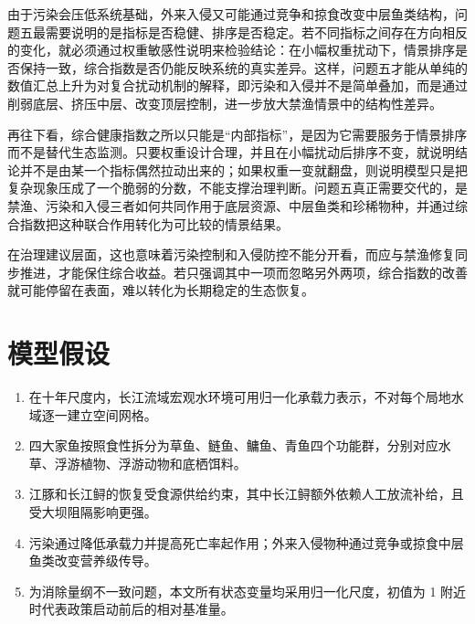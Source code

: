 \documentclass{MMCStyle}
\begin{document}
由于污染会压低系统基础，外来入侵又可能通过竞争和掠食改变中层鱼类结构，问题五最需要说明的是指标是否稳健、排序是否稳定。若不同指标之间存在方向相反的变化，就必须通过权重敏感性说明来检验结论：在小幅权重扰动下，情景排序是否保持一致，综合指数是否仍能反映系统的真实差异。这样，问题五才能从单纯的数值汇总上升为对复合扰动机制的解释，即污染和入侵并不是简单叠加，而是通过削弱底层、挤压中层、改变顶层控制，进一步放大禁渔情景中的结构性差异。

再往下看，综合健康指数之所以只能是“内部指标”，是因为它需要服务于情景排序而不是替代生态监测。只要权重设计合理，并且在小幅扰动后排序不变，就说明结论并不是由某一个指标偶然拉动出来的；如果权重一变就翻盘，则说明模型只是把复杂现象压成了一个脆弱的分数，不能支撑治理判断。问题五真正需要交代的，是禁渔、污染和入侵三者如何共同作用于底层资源、中层鱼类和珍稀物种，并通过综合指数把这种联合作用转化为可比较的情景结果。

在治理建议层面，这也意味着污染控制和入侵防控不能分开看，而应与禁渔修复同步推进，才能保住综合收益。若只强调其中一项而忽略另外两项，综合指数的改善就可能停留在表面，难以转化为长期稳定的生态恢复。

\section{模型假设}
\begin{enumerate}
\item 在十年尺度内，长江流域宏观水环境可用归一化承载力表示，不对每个局地水域逐一建立空间网格。
\item 四大家鱼按照食性拆分为草鱼、鲢鱼、鳙鱼、青鱼四个功能群，分别对应水草、浮游植物、浮游动物和底栖饵料。
\item 江豚和长江鲟的恢复受食源供给约束，其中长江鲟额外依赖人工放流补给，且受大坝阻隔影响更强。
\item 污染通过降低承载力并提高死亡率起作用；外来入侵物种通过竞争或掠食中层鱼类改变营养级传导。
\item 为消除量纲不一致问题，本文所有状态变量均采用归一化尺度，初值为 1 附近时代表政策启动前后的相对基准量。
\end{enumerate}
\end{document}
